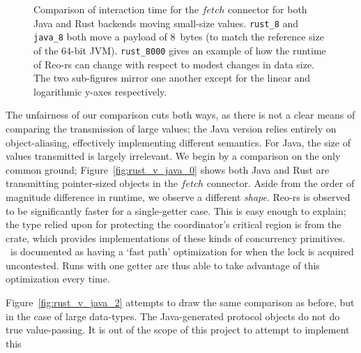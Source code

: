\begin{figure}
{\begin{subfigure}[b]{0.63\textwidth}
			\caption{}
			\label{fig:rust_v_java_1}
		\end{subfigure}%
	}
	\caption[Java vs.\ Rust interaction time for small values.]{Comparison of interaction time for the $fetch$ connector for both Java and Rust backends moving small-size values. \texttt{rust\_8} and \texttt{java\_8}  both move a payload of 8~bytes (to match the reference size of the 64-bit JVM). \texttt{rust\_8000}  gives an example of how the runtime of Reo-rs can change with respect to modest changes in data size. The two sub-figures mirror one another except for the linear and logarithmic y-axes respectively.}
	\label{fig:rust_v_java}
\end{figure}

The unfairness of our comparison cuts both ways, as there is not a clear means of comparing the transmission of large values; the Java version relies entirely on object-aliasing, effectively implementing different semantics. For Java, the size of values transmitted is largely irrelevant. We begin by a comparison on the only common ground; Figure~\ref{fig:rust_v_java_0} shows both Java and Rust are transmitting pointer-sized objects in the $fetch$ connector. Aside from the order of magnitude difference in runtime, we observe a different \textit{shape}. Reo-rs is observed to be significantly faster for a single-getter case. This is easy enough to explain; the type relied upon for protecting the coordinator's critical region is  from the  crate, which provides implementations of these kinds of concurrency primitives. ~is documented as having a `fast path' optimization for when the lock is acquired uncontested. Runs with one getter are thus able to take advantage of this optimization every time.

Figure~\ref{fig:rust_v_java_2} attempts to draw the same comparison as before, but in the case of large data-types. The Java-generated protocol objects do not do true value-passing. It is out of the scope of this project to attempt to implement this

